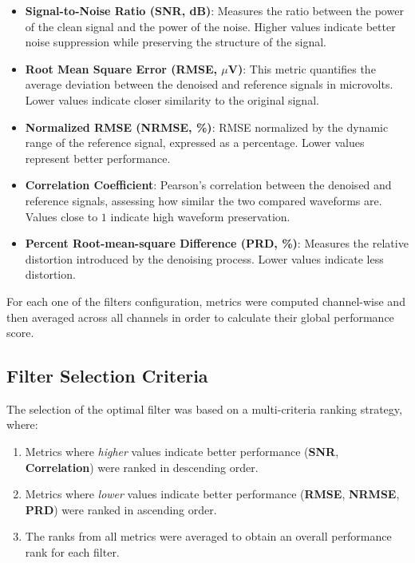 \documentclass{article}
\begin{document}
			\begin{itemize}
			    \item \textbf{Signal-to-Noise Ratio (SNR, dB)}: Measures the ratio between the power of the clean 
				    signal and the power of the noise. Higher values indicate better noise suppression 
				    while preserving the structure of the signal.
			    \item \textbf{Root Mean Square Error (RMSE, $\mu$V)}: This metric quantifies 
				    the average deviation between the denoised and reference signals in microvolts. 
					Lower values indicate closer similarity to the original signal.
			    \item \textbf{Normalized RMSE (NRMSE, \%)}: RMSE normalized by the dynamic range of the 
				    reference signal, expressed as a percentage. 
					Lower values represent better performance.
			    \item \textbf{Correlation Coefficient}: Pearson's correlation between the denoised and 
				    reference signals, assessing how similar the two compared waveforms are.
					Values close to $1$ indicate high waveform preservation.
			    \item \textbf{Percent Root-mean-square Difference (PRD, \%)}: Measures the relative distortion 
				    introduced by the denoising process. 
					Lower values indicate less distortion.
			\end{itemize}

			For each one of the filters configuration, metrics were computed 
			channel-wise and then averaged across all channels in order to
			calculate their global performance score. 

			\subsection{Filter Selection Criteria}

			The selection of the optimal filter was based on a multi-criteria ranking strategy, where:
			\begin{enumerate}
			    \item Metrics where \textit{higher} values indicate better performance (\textbf{SNR}, \textbf{Correlation}) were ranked in descending order.
			    \item Metrics where \textit{lower} values indicate better performance (\textbf{RMSE}, \textbf{NRMSE}, \textbf{PRD}) were ranked in ascending order.
			    \item The ranks from all metrics were averaged to obtain an overall performance rank for each filter.
			\end{enumerate}
\end{document}
